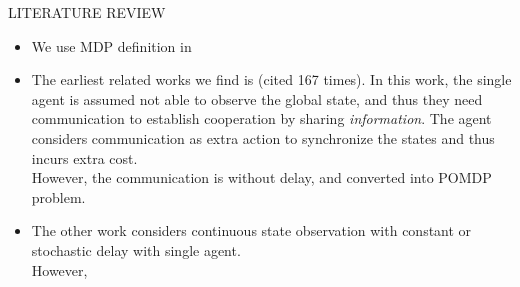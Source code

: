 \documentclass[10pt, conference, letterpaper]{IEEEtran}
\begin{document}
    \begin{section}{LITERATURE REVIEW}
        \label{sec:review}
        \begin{itemize}
            \item We use MDP definition in \cite{sutton1998introduction}
            \item The earliest related works we find is \cite{ref-01} (cited 167 times). In this work, the single agent is assumed not able to observe the global state, and thus they need communication to establish cooperation by sharing \emph{information}. The agent considers communication as extra action to synchronize the states and thus incurs extra cost. \\
            However, the communication is without delay, and converted into POMDP problem.
            \item The other work \cite{ref-02} considers continuous state observation with constant or stochastic delay with single agent. \\
            However, 
        \end{itemize}
    \end{section}
\end{document}
